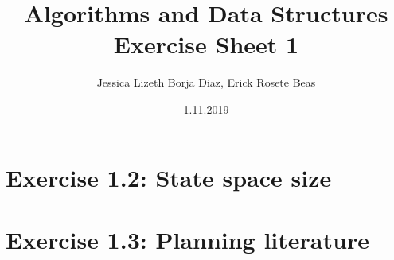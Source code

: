 \documentclass[11pt,a4paper]{article}
\title{\textbf{Algorithms and Data Structures
\\{\Large Exercise Sheet 1}}}
\author{Jessica Lizeth Borja Diaz, Erick Rosete Beas}
\date{1.11.2019}
\begin{document}
\maketitle


\section*{Exercise 1.2: State space size}
\section*{Exercise 1.3: Planning literature}
\end{document}
